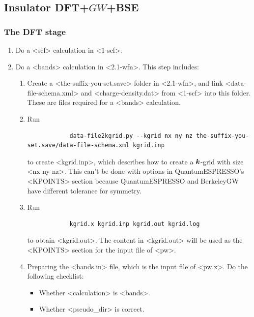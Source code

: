 \documentclass[hyperref, a4paper]{report}
\def\texttt#1{<#1>}%
\newcommand{\shortcode}[1]{\texttt{#1}}
\begin{document}
\subsection{Insulator DFT+$GW$+BSE}

\subsubsection{The DFT stage}

\begin{enumerate}
    \item Do a \shortcode{scf} calculation in \shortcode{1-scf}.
    \item Do a \shortcode{bands} calculation in \shortcode{2.1-wfn}. This step includes: 
    \begin{enumerate}
        \item Create a \shortcode{the-suffix-you-set.save} folder in \shortcode{2.1-wfn},
        and link \shortcode{data-file-schema.xml} and \shortcode{charge-density.dat} 
        from \shortcode{1-scf}
        into this folder.
        These are files required for a \shortcode{bands} calculation.
        \item Run  
        \begin{lstlisting}
            data-file2kgrid.py --kgrid nx ny nz the-suffix-you-set.save/data-file-schema.xml kgrid.inp
        \end{lstlisting}
        to create \shortcode{kgrid.inp},
        which describes how to create a $\vb*{k}$-grid with size \shortcode{nx ny nz}.
        This can't be done with options in QuantumESPRESSO's \shortcode{KPOINTS} section 
        because QuantumESPRESSO and BerkeleyGW have different tolerance for symmetry.
        \item Run 
        \begin{lstlisting}
            kgrid.x kgrid.inp kgrid.out kgrid.log
        \end{lstlisting}
        to obtain \shortcode{kgrid.out}.
        The content in \shortcode{kgrid.out} will be used as the \shortcode{KPOINTS} section 
        for the input file of \shortcode{pw}.
        \item Preparing the \shortcode{bands.in} file, which is the input file of \shortcode{pw.x}.
        Do the following checklist:
        \begin{itemize}
            \item Whether \shortcode{calculation} is \shortcode{bands}.
            \item Whether \shortcode{pseudo_dir} is correct.

\end{itemize}
\end{enumerate}
\end{enumerate}
\end{document}

